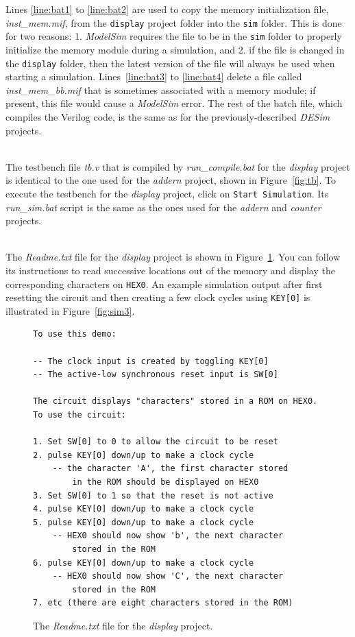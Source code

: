 \documentclass[epsfig,10pt,fullpage]{article} \addtolength{\textwidth}{1.5in}
\begin{document}
\noindent
Lines \ref{line:bat1} to \ref{line:bat2} are used to copy the memory initialization file,
{\it inst\_mem.mif}, from the \texttt{display} project folder into the \texttt{sim}
folder. This is done for two reasons: 1. {\it ModelSim} requires the file to be in the
\texttt{sim} folder to properly initialize the memory module during a simulation, and 2. 
if the file is changed in the \texttt{display} folder, then the latest version of the file 
will always be used when starting a simulation. Lines~\ref{line:bat3} to \ref{line:bat4}
delete a file called {\it inst\_mem\_bb.mif} that is sometimes associated with a memory
module; if present, this file would cause a {\it ModelSim} error. The rest of the batch
file, which compiles the Verilog code, is the same as for the previously-described {\it DESim}
projects.

~\\
\noindent
The testbench file {\it tb.v} that is compiled by {\it run\_compile.bat} for the {\it display}
project is identical to the one used for the {\it addern} project, shown in Figure~\ref{fig:tb}.
To execute the testbench for the {\it display} project, click on 
\texttt{Start Simulation}. Its {\it run\_sim.bat} script is the same as the 
ones used for the {\it addern} and {\it counter} projects.

~\\
The {\it Readme.txt} file for the {\it display} project is shown in Figure~\ref{fig:readme2}.
You can follow its instructions to read successive locations out of the memory and
display the corresponding characters on \texttt{HEX0}. An example simulation output after
first resetting the circuit and then creating a few clock cycles using \texttt{KEY[0]}
is illustrated in Figure~\ref{fig:sim3}.

\lstset{language=make,numbers=none,escapechar=|}
\begin{figure}[h]
\begin{center}
\begin{minipage}[t]{12.5 cm}
\begin{lstlisting}[name=top]
To use this demo:

-- The clock input is created by toggling KEY[0]
-- The active-low synchronous reset input is SW[0]

The circuit displays "characters" stored in a ROM on HEX0.
To use the circuit:

1. Set SW[0] to 0 to allow the circuit to be reset
2. pulse KEY[0] down/up to make a clock cycle
    -- the character 'A', the first character stored
	    in the ROM should be displayed on HEX0 
3. Set SW[0] to 1 so that the reset is not active
4. pulse KEY[0] down/up to make a clock cycle
5. pulse KEY[0] down/up to make a clock cycle
    -- HEX0 should now show 'b', the next character 
	    stored in the ROM
6. pulse KEY[0] down/up to make a clock cycle
    -- HEX0 should now show 'C', the next character 
	    stored in the ROM
7. etc (there are eight characters stored in the ROM)
\end{lstlisting}
\end{minipage}
    \caption{The {\it Readme.txt} file for the {\it display} project.}
\label{fig:readme2}
\end{center}
\end{figure}
\end{document}
